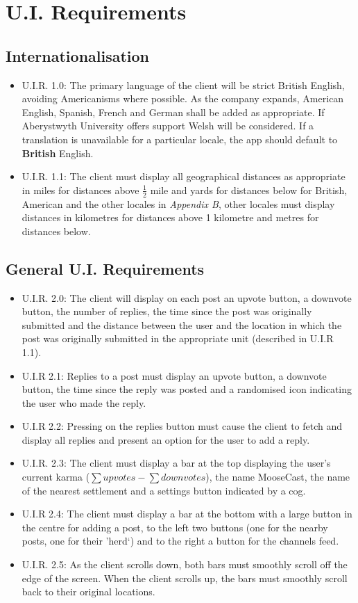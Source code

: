 \documentclass[12pt, a4paper]{article}
\begin{document}
\section{U.I. Requirements}
\subsection{Internationalisation}
\begin{itemize}
\item U.I.R. 1.0: The primary language of the client will be strict British English, avoiding Americanisms where possible. As the company expands, American English, Spanish, French and German shall be added as appropriate. If Aberystwyth University offers support Welsh will be considered. If a translation is unavailable for a particular locale, the app should default to \textbf{British} English.
\item U.I.R. 1.1: The client must display all geographical distances as appropriate in miles for distances above $\frac{1}{2}$ mile and yards for distances below for British, American and the other locales in \textit{Appendix B}, other locales must display distances in kilometres for distances above 1 kilometre and metres for distances below.
\end{itemize}

\subsection{General U.I. Requirements}
\begin{itemize}
\item U.I.R. 2.0: The client will display on each post an upvote button, a downvote button, the number of replies, the time since the post was originally submitted and the distance between the user and the location in which the post was originally submitted in the appropriate unit (described in U.I.R 1.1).
\item U.I.R 2.1: Replies to a post must display an upvote button, a downvote button, the time since the reply was posted and a randomised icon indicating the user who made the reply. 
\item U.I.R 2.2: Pressing on the replies button must cause the client to fetch and display all replies and present an option for the user to add a reply.
\item U.I.R. 2.3: The client must display a bar at the top displaying the user's current karma ($\sum upvotes - \sum downvotes$), the name MooseCast, the name of the nearest settlement and a settings button indicated by a cog.
\item U.I.R 2.4: The client must display a bar at the bottom with a large button in the centre for adding a post, to the left two buttons (one for the nearby posts, one for their 'herd`) and to the right a button for the channels feed.
\item U.I.R. 2.5: As the client scrolls down, both bars must smoothly scroll off the edge of the screen. When the client scrolls up, the bars must smoothly scroll back to their original locations. 
\end{itemize}
\end{document}
